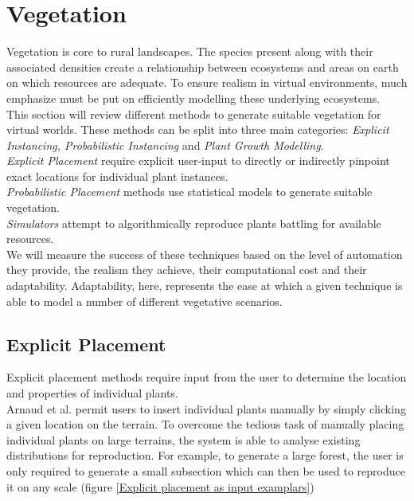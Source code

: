 \section{Vegetation}

Vegetation is core to rural landscapes. The species present along with their associated densities create a relationship between ecosystems and areas on earth on which resources are adequate. To ensure realism in virtual environments, much emphasize must be put on efficiently modelling these underlying ecosystems.\\

This section will review different methods to generate suitable vegetation for virtual worlds. These methods can be split into three main categories: \textit{Explicit Instancing, Probabilistic Instancing} and \textit{Plant Growth Modelling}.\\
\textit{Explicit Placement} require explicit user-input to directly or indirectly pinpoint exact locations for individual plant instances.\\
\textit{Probabilistic Placement} methods use statistical models to generate suitable vegetation.\\ 
\textit{Simulators} attempt to algorithmically reproduce plants battling for available resources.\\

We will measure the success of these techniques based on the level of automation they provide, the realism they achieve, their computational cost and their adaptability. Adaptability, here, represents the ease at which a given technique is able to model a number of different vegetative scenarios. \\

\subsection{Explicit Placement} \label{Explicit Placement}
Explicit placement methods require input from the user to determine the location and properties of individual plants. \\

Arnaud et al. \cite{Emilien} permit users to insert individual plants manually by simply clicking a given location on the terrain. To overcome the tedious task of manually placing individual plants on large terrains, the system is able to analyse existing distributions for reproduction. For example, to generate a large forest, the user is only required to generate a small subsection which can then be used to reproduce it on any scale (figure \ref{Explicit placement as input examplars}) \\


